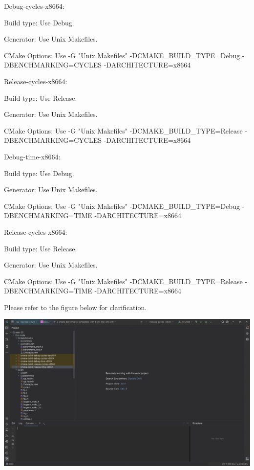 \begin{DoxyItemize}
\item Debug-\/cycles-\/x8664\+:
\begin{DoxyItemize}
\item Build type\+: Use {\ttfamily Debug}.
\item Generator\+: Use {\ttfamily Unix Makefiles}.
\item CMake Options\+: Use {\ttfamily -\/G "{}\+Unix Makefiles"{} -\/DCMAKE\+\_\+\+BUILD\+\_\+\+TYPE=Debug -\/DBENCHMARKING=CYCLES -\/DARCHITECTURE=x8664}
\end{DoxyItemize}
\item Release-\/cycles-\/x8664\+:
\begin{DoxyItemize}
\item Build type\+: Use {\ttfamily Release}.
\item Generator\+: Use {\ttfamily Unix Makefiles}.
\item CMake Options\+: Use {\ttfamily -\/G "{}\+Unix Makefiles"{} -\/DCMAKE\+\_\+\+BUILD\+\_\+\+TYPE=Release -\/DBENCHMARKING=CYCLES -\/DARCHITECTURE=x8664}
\end{DoxyItemize}
\item Debug-\/time-\/x8664\+:
\begin{DoxyItemize}
\item Build type\+: Use {\ttfamily Debug}.
\item Generator\+: Use {\ttfamily Unix Makefiles}.
\item CMake Options\+: Use {\ttfamily -\/G "{}\+Unix Makefiles"{} -\/DCMAKE\+\_\+\+BUILD\+\_\+\+TYPE=Debug -\/DBENCHMARKING=TIME -\/DARCHITECTURE=x8664}
\end{DoxyItemize}
\item Release-\/cycles-\/x8664\+:
\begin{DoxyItemize}
\item Build type\+: Use {\ttfamily Release}.
\item Generator\+: Use {\ttfamily Unix Makefiles}.
\item CMake Options\+: Use {\ttfamily -\/G "{}\+Unix Makefiles"{} -\/DCMAKE\+\_\+\+BUILD\+\_\+\+TYPE=Release -\/DBENCHMARKING=TIME -\/DARCHITECTURE=x8664}
\end{DoxyItemize}
\end{DoxyItemize}

Please refer to the figure below for clarification.

 
\begin{DoxyImage}
\includegraphics[width=\textwidth,height=\textheight/2,keepaspectratio=true]{cmake-profile.gif}
\end{DoxyImage}
    